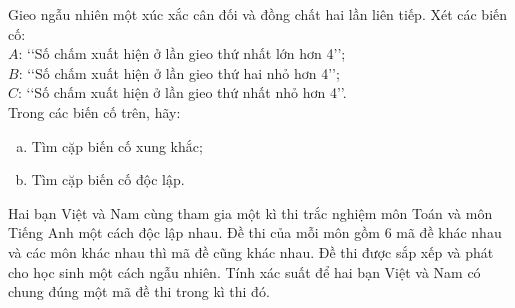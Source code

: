 \begin{bt}%
	Gieo ngẫu nhiên một xúc xắc cân đối và đồng chất hai lần liên tiếp. Xét các biến cố:\\
	$A$: \lq\lq Số chấm xuất hiện ở lần gieo thứ nhất lớn hơn 4\rq\rq ;\\
	$B$: \lq\lq Số chấm xuất hiện ở lần gieo thứ hai nhỏ hơn 4\rq\rq ;\\
	$C$: \lq\lq Số chấm xuất hiện ở lần gieo thứ nhất nhỏ hơn 4\rq\rq.\\
	Trong các biến cố trên, hãy:
	\begin{enumerate}[a)]
		\item Tìm cặp biến cố xung khắc;
		\item Tìm cặp biến cố độc lập.
	\end{enumerate}
\end{bt}

\begin{bt}%
	Hai bạn Việt và Nam cùng tham gia một kì thi trắc nghiệm môn Toán và môn Tiếng Anh một cách độc lập nhau. Đề thi của mỗi môn gồm $6$ mã đề khác nhau và các môn khác nhau thì mã đề cũng khác nhau. Đề thi được sắp xếp và phát cho học sinh một cách ngẫu nhiên. Tính xác suất để hai bạn Việt và Nam có chung đúng một mã đề thi trong kì thi đó.
\end{bt}

